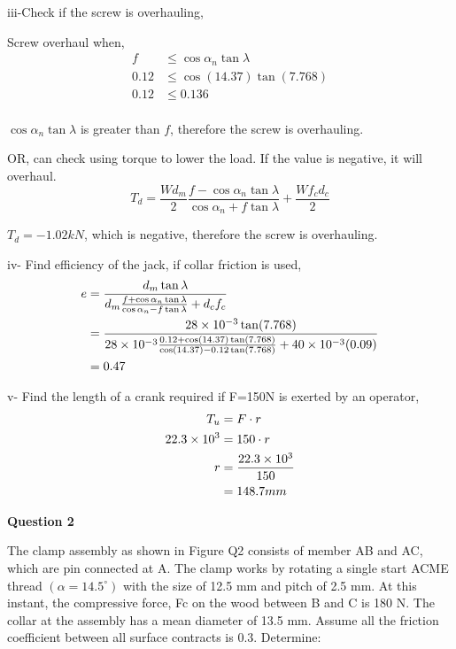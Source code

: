 \documentclass[a4paper, fleqn]{article}
\providecommand{\sci}[1]{\protect\ensuremath{\times 10^{\StrSubstitute[0]{#1}{e}{}}}}
\begin{document}
iii-Check if the screw is overhauling,

Screw overhaul when,
\begin{equation*}
    \begin{aligned}
    f &\le \cos \alpha_n \tan \lambda \\
    0.12 &\le \cos(14.37) \tan(7.768)\\
    0.12 &\le 0.136\\
    \end{aligned}
\end{equation*}

$\cos \alpha_n \tan \lambda$ is greater than $f$, therefore the screw is overhauling.

OR, can check using torque to lower the load. If the value is negative, it will overhaul.
$$T_d = \frac{Wd_m}{2} \frac{f-\cos\alpha_n \tan\lambda}{\cos\alpha_n + f\tan\lambda} + \frac{Wf_c d_c}{2}$$

$T_d=-1.02kN$, which is negative, therefore the screw is overhauling.

iv- Find efficiency of the jack, if collar friction is used,
\begin{equation*}
    \begin{aligned}
    e &=\frac{d_m \tan \lambda}{d_m \frac{f+\cos\alpha_n \tan\lambda}{\cos\alpha_n - f\tan\lambda}+d_c f_c} \\
    &=\frac{28\sci{e-3} \tan(7.768)}{28\sci{e-3} \frac{0.12+\cos(14.37) \tan(7.768)}{\cos(14.37) - 0.12\tan(7.768)}+40\sci{e-3} (0.09)} \\
    &=0.47
    \end{aligned}
\end{equation*}

v- Find the length of a crank required if F=150N is exerted by an operator,
\begin{equation*}
    \begin{aligned}
    T_u &= F \cdot r\\
    22.3\sci{e3} &= 150 \cdot r\\
    r &= \frac{22.3\sci{e3}}{150}\\
    &=148.7 mm
    \end{aligned}
\end{equation*}

\newpage
\textbf{Question 2}

The clamp assembly as shown in Figure Q2 consists of member AB and AC, which are pin connected at A. The clamp works by rotating a single start ACME thread $(\alpha=14.5^{\circ})$ with the size of 12.5 mm and pitch of 2.5 mm. At this instant, the compressive force, Fc on the wood between B and C is 180 N. The collar at the assembly has a mean diameter of 13.5 mm. Assume all the friction coefficient between all surface contracts is 0.3. Determine:
\end{document}
